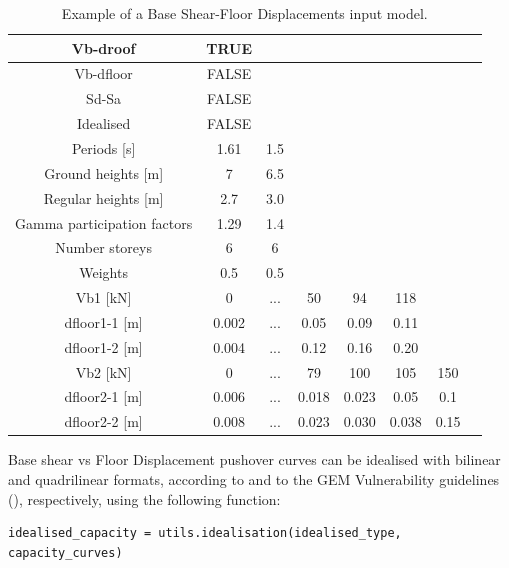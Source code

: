 \begin {table}[htb]
\caption{Example of a Base Shear-Floor Displacements input model.}
\label{table:Vb-dfloor_input}
\begin{center}
  \begin{tabular}{ | c | c | c | c | c | c | c | c |}
  \hline
    Vb-droof & TRUE &  &  & & & \\ \hline
    Vb-dfloor & FALSE & & & & &  \\ \hline
    Sd-Sa & FALSE & & & & & \\ \hline
    Idealised & FALSE & & & & & \\ \hline
    Periods [s] & 1.61 & 1.5 & & & & \\ \hline
    Ground heights [m] & 7 & 6.5 & & & & \\ \hline
    Regular heights [m] & 2.7 & 3.0 & & & & \\ \hline
    Gamma participation factors & 1.29 & 1.4 & & & & \\ \hline
    Number storeys & 6 & 6 & & & & \\ \hline
    Weights & 0.5 & 0.5 & & & & \\ \hline
    Vb1 [kN] & 0	& ...	& 50	& 94	& 118	& \\ \hline
	  dfloor1-1 [m] & 0.002	& ...	& 0.05	& 0.09	& 0.11	& \\ \hline
	  dfloor1-2 [m] & 0.004	& ...	& 0.12	& 0.16	& 0.20	& \\ \hline
    Vb2 [kN] & 0	& ...	& 79	& 100	& 105	& 150 \\ \hline
    dfloor2-1 [m] & 0.006 &	...	& 0.018	& 0.023	& 0.05	& 0.1 \\ \hline
	dfloor2-2 [m] & 0.008	& ... &	0.023	& 0.030	& 0.038	& 0.15 \\ \hline
  \end{tabular}
\end{center}
\end{table}

Base shear vs Floor Displacement pushover curves can be idealised with bilinear and quadrilinear formats, according to \citep{FEMA4402005} and to the GEM Vulnerability guidelines (\citep{Dayala2014}), respectively, using the following function:

\begin{Verbatim}[frame=single, commandchars=\\\{\}, samepage=true]
idealised_capacity = utils.idealisation(idealised_type, capacity_curves)
\end{Verbatim}

